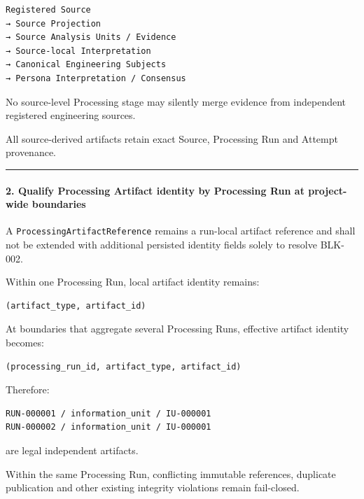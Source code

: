 \begin{verbatim}
Registered Source
→ Source Projection
→ Source Analysis Units / Evidence
→ Source-local Interpretation
→ Canonical Engineering Subjects
→ Persona Interpretation / Consensus
\end{verbatim}

No source-level Processing stage may silently merge evidence from independent registered engineering sources.

All source-derived artifacts retain exact Source, Processing Run and Attempt provenance.

\begin{center}\rule{0.5\linewidth}{0.5pt}\end{center}

\hypertarget{2-qualify-processing-artifact-identity-by-processing-run-at-project-wide-boundaries}{%
\paragraph{2. Qualify Processing Artifact identity by Processing Run at project-wide boundaries}\label{2-qualify-processing-artifact-identity-by-processing-run-at-project-wide-boundaries}}

A \texttt{ProcessingArtifactReference} remains a run-local artifact reference and shall not be extended with additional persisted identity fields solely to resolve BLK-002.

Within one Processing Run, local artifact identity remains:

\begin{verbatim}
(artifact_type, artifact_id)
\end{verbatim}

At boundaries that aggregate several Processing Runs, effective artifact identity becomes:

\begin{verbatim}
(processing_run_id, artifact_type, artifact_id)
\end{verbatim}

Therefore:

\begin{verbatim}
RUN-000001 / information_unit / IU-000001
RUN-000002 / information_unit / IU-000001
\end{verbatim}

are legal independent artifacts.

Within the same Processing Run, conflicting immutable references, duplicate publication and other existing integrity violations remain fail-closed.

